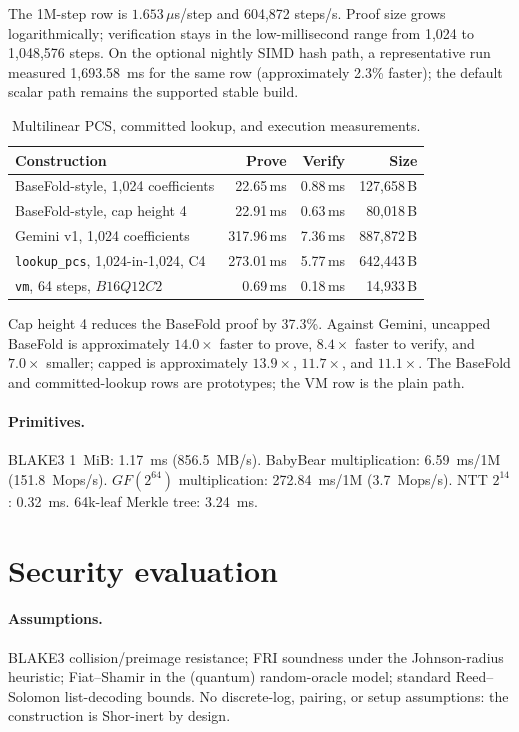 \documentclass[11pt,a4paper]{article}
\begin{document}
The 1M-step row is $1.653\,\mu$s/step and 604,872 steps/s. Proof size grows
logarithmically; verification stays in the low-millisecond range from 1,024
to 1,048,576 steps. On the optional nightly SIMD hash path, a representative
run measured 1,693.58~ms for the same row (approximately 2.3\% faster); the
default scalar path remains the supported stable build.

\begin{table}[h]
\centering
\small
\begin{tabular}{@{}lrrr@{}}
\toprule
Construction & Prove & Verify & Size \\
\midrule
BaseFold-style, 1,024 coefficients & 22.65\,ms & 0.88\,ms & 127,658\,B \\
BaseFold-style, cap height 4 & 22.91\,ms & 0.63\,ms & 80,018\,B \\
Gemini v1, 1,024 coefficients & 317.96\,ms & 7.36\,ms & 887,872\,B \\
\texttt{lookup\_pcs}, 1,024-in-1,024, C4 & 273.01\,ms & 5.77\,ms & 642,443\,B \\
\texttt{vm}, 64 steps, $B16Q12C2$ & 0.69\,ms & 0.18\,ms & 14,933\,B \\
\bottomrule
\end{tabular}
\caption{Multilinear PCS, committed lookup, and execution measurements.}
\end{table}

Cap height 4 reduces the BaseFold proof by 37.3\%. Against Gemini, uncapped
BaseFold is approximately $14.0\times$ faster to prove, $8.4\times$ faster to
verify, and $7.0\times$ smaller; capped is approximately $13.9\times$,
$11.7\times$, and $11.1\times$. The BaseFold and committed-lookup rows are
prototypes; the VM row is the plain path.

\paragraph{Primitives.} BLAKE3 1~MiB: 1.17~ms (856.5~MB/s). BabyBear
multiplication: 6.59~ms/1M (151.8~Mops/s). $GF(2^{64})$ multiplication:
272.84~ms/1M (3.7~Mops/s). NTT $2^{14}$: 0.32~ms. 64k-leaf Merkle tree:
3.24~ms.

\section{Security evaluation}

\paragraph{Assumptions.} BLAKE3 collision/preimage resistance; FRI
soundness under the Johnson-radius heuristic; Fiat--Shamir in the (quantum)
random-oracle model; standard Reed--Solomon list-decoding bounds. No
discrete-log, pairing, or setup assumptions: the construction is Shor-inert
by design.
\end{document}
